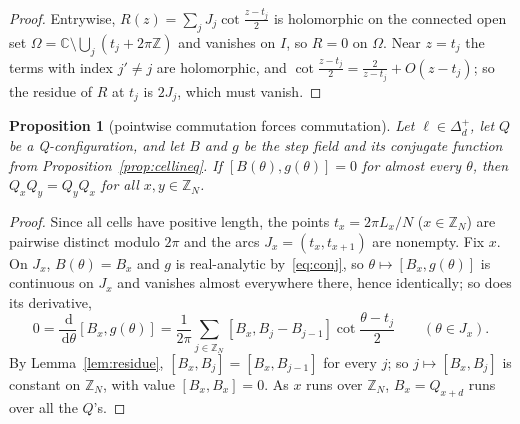 \documentclass[11pt]{amsart}
\newtheorem{proposition}[theorem]{Proposition}
\theoremstyle{definition}
\theoremstyle{remark}
\numberwithin{equation}{section}
\newcommand{\Z}{\mathbb{Z}}
\newcommand{\C}{\mathbb{C}}
\newcommand{\dd}{\,\mathrm{d}}
\begin{document}
\begin{proof}
Entrywise, $R(z)=\sum_jJ_j\cot\frac{z-t_j}2$ is holomorphic on the connected open set $\Omega=\C\setminus\bigcup_j(t_j+2\pi\Z)$ and
vanishes on $I$, so $R=0$ on $\Omega$. Near $z=t_j$ the terms with index $j'\ne j$ are holomorphic, and
$\cot\frac{z-t_j}2=\frac2{z-t_j}+O(z-t_j)$; so the residue of $R$ at $t_j$ is $2J_j$, which must vanish.
\end{proof}

\begin{proposition}[pointwise commutation forces commutation]\label{prop:residue}
Let $\ell\in\Delta_d^+$, let $Q$ be a Q-configuration, and let $B$ and $g$ be the step field and its conjugate function
from Proposition~\ref{prop:cellineq}. If $[B(\theta),g(\theta)]=0$ for almost every $\theta$, then $Q_xQ_y=Q_yQ_x$ for all
$x,y\in\Z_N$.
\end{proposition}

\begin{proof}
Since all cells have positive length, the points $t_x=2\pi L_x/N$ ($x\in\Z_N$) are pairwise distinct modulo $2\pi$ and the arcs
$J_x=(t_x,t_{x+1})$ are nonempty. Fix $x$. On $J_x$, $B(\theta)=B_x$ and $g$ is real-analytic by~\eqref{eq:conj}, so
$\theta\mapsto[B_x,g(\theta)]$ is continuous on $J_x$ and vanishes almost everywhere there, hence identically; so does its
derivative,
\[
0=\frac{\dd}{\dd\theta}[B_x,g(\theta)]=\frac1{2\pi}\sum_{j\in\Z_N}[B_x,B_j-B_{j-1}]\cot\frac{\theta-t_j}2\qquad(\theta\in J_x).
\]
By Lemma~\ref{lem:residue}, $[B_x,B_j]=[B_x,B_{j-1}]$ for every $j$; so $j\mapsto[B_x,B_j]$ is constant on $\Z_N$, with value
$[B_x,B_x]=0$. As $x$ runs over $\Z_N$, $B_x=Q_{x+d}$ runs over all the $Q$'s.
\end{proof}
\end{document}
